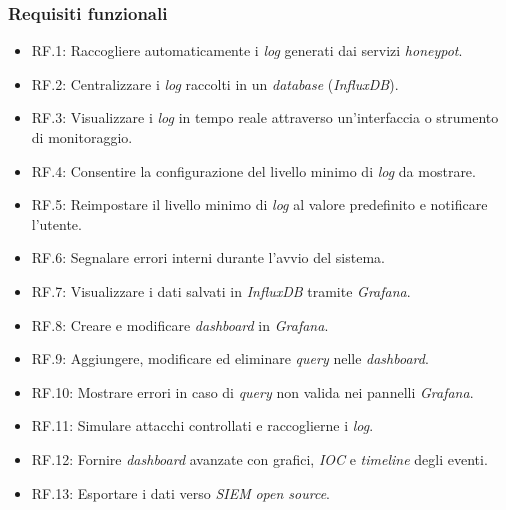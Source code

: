 \subsubsection*{Requisiti funzionali}
\begin{itemize}[noitemsep, topsep=0pt]
    \item RF.1: Raccogliere automaticamente i \textit{log} generati dai servizi \textit{honeypot}.
    \item RF.2: Centralizzare i \textit{log} raccolti in un \textit{database} (\textit{InfluxDB}).
    \item RF.3: Visualizzare i \textit{log} in tempo reale attraverso un'interfaccia o strumento di monitoraggio.
    \item RF.4: Consentire la configurazione del livello minimo di \textit{log} da mostrare.
    \item RF.5: Reimpostare il livello minimo di \textit{log} al valore predefinito e notificare l'utente.
    \item RF.6: Segnalare errori interni durante l'avvio del sistema.
    \item RF.7: Visualizzare i dati salvati in \textit{InfluxDB} tramite \textit{Grafana}.
    \item RF.8: Creare e modificare \textit{dashboard} in \textit{Grafana}.
    \item RF.9: Aggiungere, modificare ed eliminare \textit{query} nelle \textit{dashboard}.
    \item RF.10: Mostrare errori in caso di \textit{query} non valida nei pannelli \textit{Grafana}.
    \item RF.11: Simulare attacchi controllati e raccoglierne i \textit{log}.
    \item RF.12: Fornire \textit{dashboard} avanzate con grafici, \textit{IOC} e \textit{timeline} degli eventi.
    \item RF.13: Esportare i dati verso \textit{SIEM} \textit{open source}.
\end{itemize}

